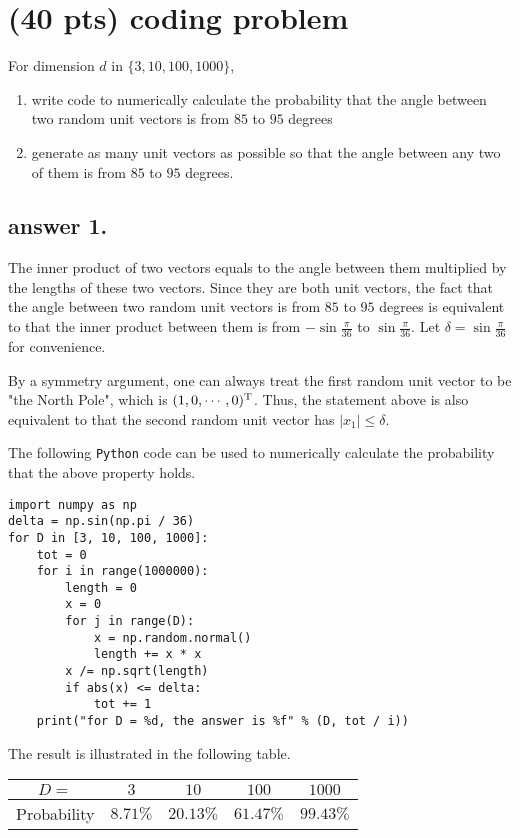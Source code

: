 \documentclass[12pt]{article}%
\begin{document}
\section{(40 pts) coding problem}
For dimension $d$ in $\{3,10,100,1000\}$,
\begin{enumerate}
    \item write code to numerically calculate the probability that the angle between two random unit vectors is from $85$ to $95$ degrees
    \item generate as many unit vectors as possible so that the angle between any two of them is from $85$ to $95$ degrees.
\end{enumerate}

\subsection*{answer 1.}

	The inner product of two vectors equals to the angle between them multiplied by the lengths of these two vectors. Since they are both unit vectors, the fact that the angle between two random unit vectors is from $85$ to $95$ degrees is equivalent to that the inner product between them is from $-\sin\frac{\pi}{36}$ to $\sin\frac{\pi}{36}$. Let $\delta = \sin\frac{\pi}{36}$ for convenience.
	
	By a symmetry argument, one can always treat the first random unit vector to be "the North Pole", which is $(1, 0, \cdots, 0)^{\text T}$. Thus, the statement above is also equivalent to that the second random unit vector has $|x_1| \le \delta$.
	
	The following \texttt{Python} code can be used to numerically calculate the probability that the above property holds.
\begin{verbatim}
import numpy as np
delta = np.sin(np.pi / 36)
for D in [3, 10, 100, 1000]:
    tot = 0
    for i in range(1000000):
        length = 0
        x = 0
        for j in range(D):
            x = np.random.normal()
            length += x * x
        x /= np.sqrt(length)
        if abs(x) <= delta:
            tot += 1
    print("for D = %d, the answer is %f" % (D, tot / i))
\end{verbatim}

	The result is illustrated in the following table.
	\begin{center}
	\begin{tabular}{|c|c|c|c|c|}
		\hline 
		$D = $ & $3$ & $10$ & $100$ & $1000$ \\ 
		\hline 
		Probability & $8.71\%$ & $20.13\%$ & $61.47\%$ & $99.43\%$\\
		\hline
	\end{tabular}
	\end{center}
\end{document}
